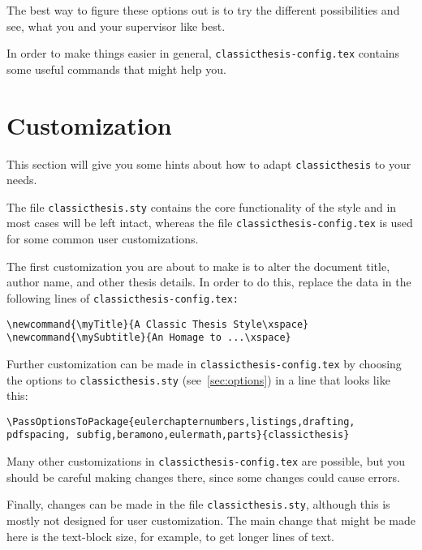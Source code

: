 \noindent The best way to figure these options out is to try the different possibilities and see, what you and your supervisor like best.

In order to make things easier in general, \texttt{classicthesis-config.tex} contains some useful commands that might help you.


\section{Customization}\label{sec:custom}

This section will give you some hints about how to adapt \texttt{classicthesis} to your needs.

The file \texttt{classicthesis.sty} contains the core functionality of the style and in most cases will be left intact, whereas the file \texttt{classic\-thesis-config.tex} is used for some common user customizations. 

The first customization you are about to make is to alter the document title, author name, and other thesis details. In order to do this, replace the data in the following lines of \texttt{classicthesis-config.tex:}

\begin{lstlisting}
\newcommand{\myTitle}{A Classic Thesis Style\xspace}
\newcommand{\mySubtitle}{An Homage to ...\xspace}
\end{lstlisting}

Further customization can be made in \texttt{classicthesis-config.tex} by choosing the options to \texttt{classicthesis.sty} (see~\autoref{sec:options}) in a line that looks like this:

\begin{lstlisting}
\PassOptionsToPackage{eulerchapternumbers,listings,drafting, pdfspacing, subfig,beramono,eulermath,parts}{classicthesis}
\end{lstlisting}

Many other customizations in \texttt{classicthesis-config.tex} are possible, but you should be careful making changes there, since some changes could cause errors.

Finally, changes can be made in the file \texttt{classicthesis.sty},  although this is mostly not designed for user customization. The main change that might be made here is the text-block size, for example, to get longer lines of text.

